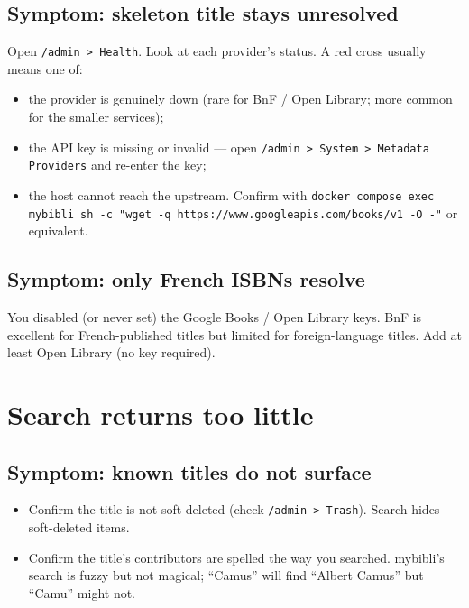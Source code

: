 \subsection*{Symptom: skeleton title stays unresolved}

Open \texttt{/admin > Health}. Look at each provider's status. A
red cross usually means one of:

\begin{itemize}
  \item the provider is genuinely down (rare for BnF / Open Library;
        more common for the smaller services);
  \item the API key is missing or invalid — open
        \texttt{/admin > System > Metadata Providers} and re-enter
        the key;
  \item the host cannot reach the upstream. Confirm with
        \texttt{docker compose exec mybibli sh -c "wget -q
        https://www.googleapis.com/books/v1 -O -"} or equivalent.
\end{itemize}

\subsection*{Symptom: only French ISBNs resolve}

You disabled (or never set) the Google Books / Open Library keys.
BnF is excellent for French-published titles but limited for
foreign-language titles. Add at least Open Library (no key
required).

\section{Search returns too little}

\subsection*{Symptom: known titles do not surface}

\begin{itemize}
  \item Confirm the title is not soft-deleted (check
        \texttt{/admin > Trash}). Search hides soft-deleted items.
  \item Confirm the title's contributors are spelled the way you
        searched. mybibli's search is fuzzy but not magical;
        ``Camus'' will find ``Albert Camus'' but ``Camu'' might
        not.
\end{itemize}

